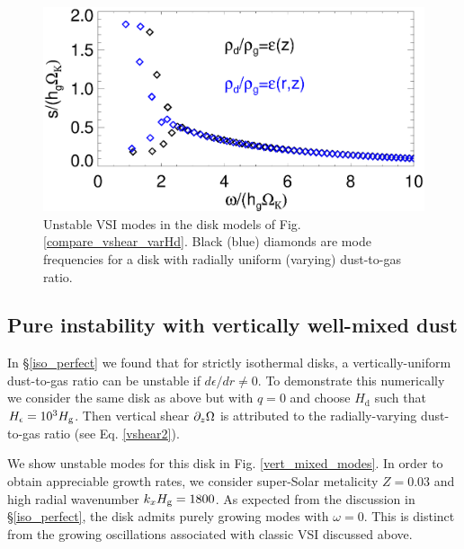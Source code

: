 \begin{figure}
  \includegraphics[width=\linewidth]{figures/compare_eigenvals_varHd} 
  \caption{Unstable VSI modes in the disk models of
    Fig. \protect\ref{compare_vshear_varHd}.  Black (blue) diamonds
    are mode frequencies for a disk with radially uniform (varying)
    dust-to-gas ratio. 
    \label{vsi_dust_varHd}
    }
\end{figure}

\subsection{Pure instability with vertically well-mixed
  dust}\label{vert_mixed} 

In \S\ref{iso_perfect} we found that for strictly isothermal
disks, a vertically-uniform dust-to-gas ratio can be unstable
if $d\epsilon/dr\neq0$.  
To demonstrate this numerically we consider the
same disk as above but with $q=0$ and choose $H_\mathrm{d}$ such
that $H_\epsilon=10^3H_\mathrm{g}$. Then vertical shear $\partial_z\Omega$ is 
attributed to the radially-varying dust-to-gas ratio (see
Eq. \ref{vshear2}).    

We show unstable modes for this disk in
Fig. \ref{vert_mixed_modes}. In order to obtain appreciable growth   
rates, we consider super-Solar metalicity $Z=0.03$ and high
radial wavenumber $k_xH_\mathrm{g}=1800$. As expected from the discussion in
\S\ref{iso_perfect}, the disk admits purely growing modes with
$\omega=0$. This is distinct from the growing oscillations associated
with classic VSI discussed above. 

